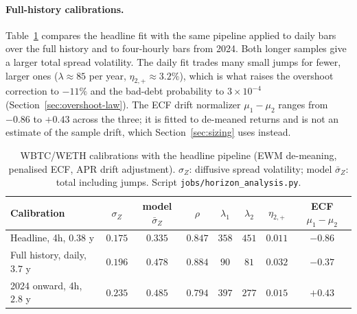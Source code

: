 \documentclass[11pt]{article}
\theoremstyle{plain}
\theoremstyle{definition}
\theoremstyle{remark}
\begin{document}
\paragraph{Full-history calibrations.} Table~\ref{tab:fullhist} compares the headline fit with the
same pipeline applied to daily bars over the full history and to four-hourly bars from 2024. Both
longer samples give a larger total spread volatility. The daily fit trades many small jumps for
fewer, larger ones ($\lambda\approx85$ per year, $\eta_{2,+}\approx3.2\%$), which is what raises the
overshoot correction to $-11\%$ and the bad-debt probability to $3\times10^{-4}$
(Section~\ref{sec:overshoot-law}). The ECF drift normalizer $\mu_1-\mu_2$ ranges from $-0.86$ to
$+0.43$ across the three; it is fitted to de-meaned returns and is not an estimate of the sample
drift, which Section~\ref{sec:sizing} uses instead.

\begin{table}[ht]
\centering\small
\begin{tabular}{lccccccc}
\toprule
Calibration & $\sigma_Z$ & model $\bar\sigma_Z$ & $\rho$ & $\lambda_1$ & $\lambda_2$ & $\eta_{2,+}$ & ECF $\mu_1-\mu_2$ \\
\midrule
Headline, 4h, $0.38$ y & $0.175$ & $0.335$ & $0.847$ & $358$ & $451$ & $0.011$ & $-0.86$ \\
Full history, daily, $3.7$ y & $0.196$ & $0.478$ & $0.884$ & $90$ & $81$ & $0.032$ & $-0.37$ \\
2024 onward, 4h, $2.8$ y & $0.235$ & $0.485$ & $0.794$ & $397$ & $277$ & $0.015$ & $+0.43$ \\
\bottomrule
\end{tabular}
\caption{WBTC/WETH calibrations with the headline pipeline (EWM de-meaning, penalised ECF, APR
drift adjustment). $\sigma_Z$: diffusive spread volatility; model $\bar\sigma_Z$: total including
jumps. Script \texttt{jobs/horizon\_analysis.py}.}
\label{tab:fullhist}
\end{table}
\end{document}
